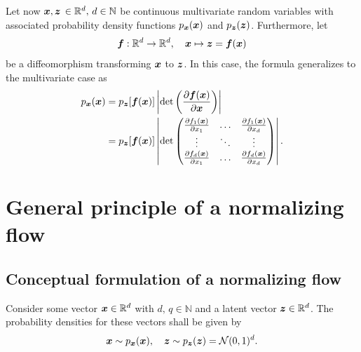 \documentclass[a4paper,12pt]{report}
\begin{document}
Let now $\bm{x}, \bm{z} \,\in\mathbb{R}^d,\,d\in\mathbb{N}$ be continuous multivariate random variables with associated probability density functions $p_{\bm{x}}(\bm{x})$ and $p_{\bm{z}}(\bm{z})$. Furthermore, let 
\begin{equation} 
\bm{f}:\mathbb{R}^d \rightarrow \mathbb{R}^d, \quad \bm{x}\mapsto\bm{z} = \bm{f}(\bm{x}) 
\end{equation} be a diffeomorphism transforming $\bm{x}$ to $\bm{z}$. In this case, the formula generalizes to the multivariate case as \begin{align}\begin{aligned}
p_{\bm{x}}(\bm{x}) &= p_{\bm{z}}[\bm{f}(\bm{x})]\left|\det\left(\frac{\partial \bm{f}(\bm{x})}{\partial \bm{x}}\right)\right| \\ &= p_{\bm{z}}[\bm{f}(\bm{x})]\left|\det\begin{pmatrix}
\tfrac{\partial f_1(\bm{x})}{\partial x_1} & \dots & \tfrac{\partial f_1(\bm{x})}{\partial x_d} \\
\vdots & \ddots & \vdots \\
\tfrac{\partial f_d(\bm{x})}{\partial x_1} & \dots & \tfrac{\partial f_d(\bm{x})}{\partial x_d}
\end{pmatrix}\right|.
\end{aligned}\end{align}

\section{General principle of a normalizing flow}

\subsection{Conceptual formulation of a normalizing flow}
Consider some vector $\bm{x} \in \mathbb{R}^d$ with $d,\,q \in \mathbb{N}$ and a latent vector $\bm{z} \in \mathbb{R}^d$. The probability densities for these vectors shall be given by \begin{equation}
\bm{x} \sim p_{\bm{x}}(\bm{x}), \quad \bm{z}\sim p_{\bm{z}}(\bm{z}) = \mathcal{N}(0,1)^d.
\end{equation}
\end{document}
